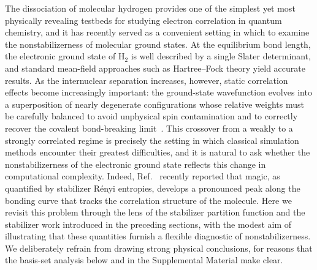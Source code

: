 \documentclass[aps,pra,superscriptaddress,twocolumn,longbibliography]{revtex4-2}
\begin{document}
The dissociation of molecular hydrogen provides one of the simplest yet most physically revealing testbeds for studying electron correlation in quantum chemistry, and it has recently served as a convenient setting in which to examine the nonstabilizerness of molecular ground states. At the equilibrium bond length, the electronic ground state of $\mathrm{H}_2$ is well described by a single Slater determinant, and standard mean-field approaches such as Hartree--Fock theory yield accurate results. As the internuclear separation increases, however, static correlation effects become increasingly important: the ground-state wavefunction evolves into a superposition of nearly degenerate configurations whose relative weights must be carefully balanced to avoid unphysical spin contamination and to correctly recover the covalent bond-breaking limit~\cite{sarkis2025moleculesmagicalnonstabilizernessmolecular}. This crossover from a weakly to a strongly correlated regime is precisely the setting in which classical simulation methods encounter their greatest difficulties, and it is natural to ask whether the nonstabilizerness of the electronic ground state reflects this change in computational complexity. Indeed, Ref.~\cite{sarkis2025moleculesmagicalnonstabilizernessmolecular} recently reported that magic, as quantified by stabilizer R\'{e}nyi entropies, develops a pronounced peak along the bonding curve that tracks the correlation structure of the molecule. Here we revisit this problem through the lens of the stabilizer partition function and the stabilizer work introduced in the preceding sections, with the modest aim of illustrating that these quantities furnish a flexible diagnostic of nonstabilizerness. We deliberately refrain from drawing strong physical conclusions, for reasons that the basis-set analysis below and in the Supplemental Material make clear.
\end{document}
